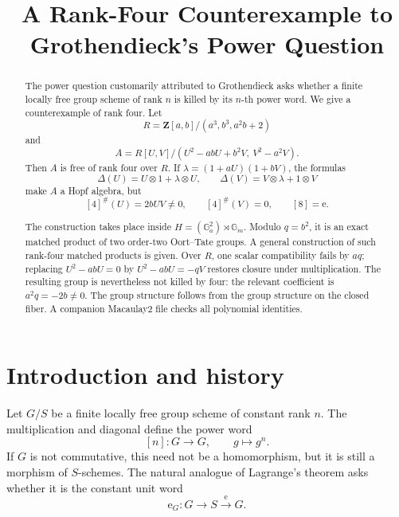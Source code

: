 \documentclass[11pt]{amsart}
\title[A rank-four counterexample]
      {A Rank-Four Counterexample to\\
       Grothendieck's Power Question}
\author{}
\date{}
\theoremstyle{remark}
\newcommand{\Z}{\mathbf Z}
\newcommand{\Ga}{\mathbb G_a}
\newcommand{\Gm}{\mathbb G_m}
\newcommand{\ot}{\otimes}
\newcommand{\unit}{\mathrm e}
\begin{document}
\begin{abstract}
The power question customarily attributed to Grothendieck asks whether a
finite locally free group scheme of rank \(n\) is killed by its
\(n\)-th power word.  We give a counterexample of rank four.  Let
\[
 R=\Z[a,b]/(a^3,b^3,a^2b+2)
\]
and
\[
 A=R[U,V]/(U^2-abU+b^2V,\ V^2-a^2V).
\]
Then \(A\) is free of rank four over \(R\).  If
\(\lambda=(1+aU)(1+bV)\), the formulas
\[
 \Delta(U)=U\ot1+\lambda\ot U,\qquad
 \Delta(V)=V\ot\lambda+1\ot V
\]
make \(A\) a Hopf algebra, but
\[
 [4]^\#(U)=2bUV\ne0,\qquad [4]^\#(V)=0,\qquad [8]=\unit.
\]

The construction takes place inside
\(H=(\Ga^2)\rtimes\Gm\).  Modulo \(q=b^2\), it is an exact matched
product of two order-two Oort--Tate groups.  A general construction of
such rank-four matched products is given.  Over \(R\), one scalar
compatibility fails by \(aq\); replacing
\(U^2-abU=0\) by \(U^2-abU=-qV\) restores closure under multiplication.
The resulting group is nevertheless not killed by four: the relevant
coefficient is \(a^2q=-2b\ne0\).
The group structure follows from the group structure on the closed
fiber.  A companion Macaulay2 file checks all polynomial identities.
\end{abstract}

\maketitle

\begin{center}
\end{center}
\medskip

\section{Introduction and history}

Let \(G/S\) be a finite locally free group scheme of constant rank \(n\).
The multiplication and diagonal define the power word
\[
 [n]\colon G\longrightarrow G,\qquad g\longmapsto g^n.
\]
If \(G\) is not commutative, this need not be a homomorphism, but it is
still a morphism of \(S\)-schemes.  The natural analogue of Lagrange's
theorem asks whether it is the constant unit word
\[
 \unit_G:G\longrightarrow S\stackrel{\unit}{\longrightarrow}G.
\]
\end{document}
